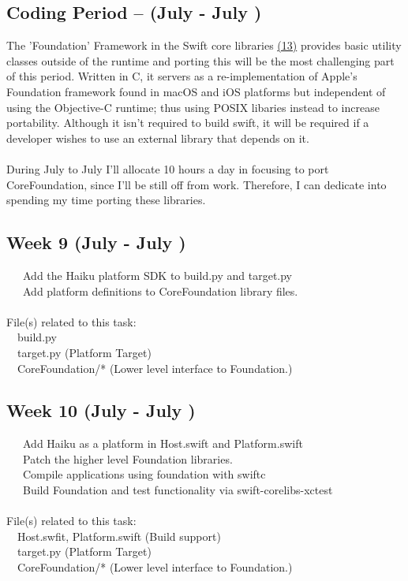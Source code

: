 \documentclass[12pt]{article}
\begin{document}
\subsection*{ Coding Period -- (July  - July )}
The 'Foundation' Framework in the Swift core libraries \hyperlink{(13)}{(13)} provides basic utility classes outside of the runtime and porting this will be the most challenging part of this period. Written in C, it servers as a re-implementation of Apple's Foundation framework found in macOS and iOS platforms but independent of using the Objective-C runtime; thus using POSIX libaries instead to increase portability. Although it isn't required to build swift, it will be required if a developer wishes to use an external library that depends on it.
\\\\
During July  to July  I'll allocate 10 hours a day in focusing to port CoreFoundation, since I'll be still off from work. Therefore, I can dedicate into spending my time porting these libraries.

\subsection*{Week 9 (July  - July )}
\textbullet \ \ \ Add the Haiku platform SDK to build.py and target.py\\
\textbullet \ \ \ Add platform definitions to CoreFoundation library files. \\\\
File(s) related to this task:\\
\textbullet \ \ build.py \\
\textbullet \ \ target.py (Platform Target) \\
\textbullet \ \ CoreFoundation/*  (Lower level interface to Foundation.)

\subsection*{Week 10 (July  - July )}
\textbullet \ \ \ Add Haiku as a platform in Host.swift and Platform.swift\\
\textbullet \ \ \ Patch the higher level Foundation libraries. \\
\textbullet \ \ \ Compile applications using foundation with swiftc \\
\textbullet \ \ \ Build Foundation and test functionality via swift-corelibs-xctest\\
\\File(s) related to this task:\\
\textbullet \ \ Host.swfit, Platform.swift (Build support)\\
\textbullet \ \ target.py (Platform Target) \\
\textbullet \ \ CoreFoundation/*  (Lower level interface to Foundation.)
\end{document}
